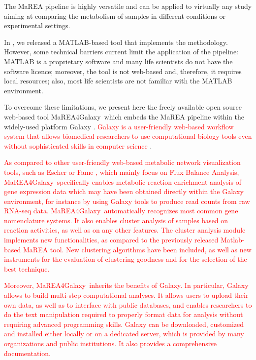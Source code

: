 \documentclass[preprint,12pt,authoryear]{elsarticle}
\newcommand{\red}{\textcolor{red}}
\newcommand{\mareagalaxy}{\textsf{MaREA4Galaxy}}
\begin{document}
The \textsf{MaREA} pipeline is highly versatile and can be applied to virtually any study aiming at comparing the metabolism of samples in different conditions or experimental settings.

In \citep{marea}, we released a MATLAB-based tool that implements the methodology. However, some technical barriers current limit the application of the pipeline: MATLAB is a proprietary software and many life scientists do not have the software licence; moreover, the tool is not web-based and, therefore, it requires local resources; also, most life scientists are not familiar with the MATLAB environment. 

To overcome these limitations, we present here the freely available open source web-based tool \mareagalaxy\ which embeds the \textsf{MaREA} pipeline within the widely-used platform Galaxy \citep{galaxy}.
\textcolor{red}{Galaxy is a user-friendly web-based workflow system that allows biomedical researchers to use computational biology tools even without sophisticated skills in  computer science}
\citep{galaxy}.

\red{As compared to other user-friendly web-based metabolic network visualization tools, such as Escher \citep{king2015escher} or Fame \citep{boele2012fame}, which mainly focus on Flux Balance Analysis, \mareagalaxy\ specifically enables metabolic reaction enrichment analysis of gene expression data which may have been obtained directly within the Galaxy environment, for instance by using Galaxy tools to produce read counts from raw RNA-seq data. \mareagalaxy\ automatically recognizes most common gene nomenclature systems.
It also enables cluster analysis of samples based on reaction activities, as well as on any other features. The cluster analysis module implements new functionalities, as compared to the previously released Matlab-based \textsf{MaREA} tool. New clustering algorithms have been included, as well as new instruments for the evaluation of clustering goodness and for the selection of the best technique.} 

\red{Moreover, \mareagalaxy\ inherits the benefits of Galaxy.
In particular, Galaxy allows to build multi-step computational analyses. It allows users to upload their own data, as well as to interface with public databases, and enables researchers to do the text manipulation required to properly format data for analysis without requiring advanced programming skills. 
Galaxy can be downloaded, customized and installed either locally or on a dedicated server, which is provided by many organizations and public institutions. It also provides a comprehensive documentation.}
\end{document}

